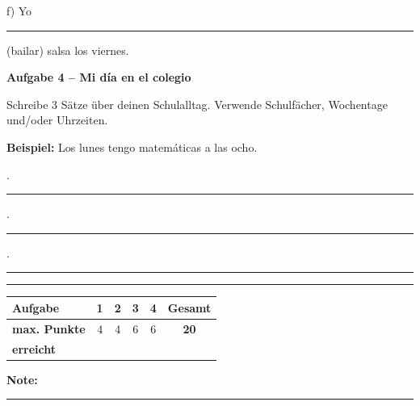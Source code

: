 \documentclass[11pt, a4paper]{article}
\newcommand{\fachfarbe}{spanisch}
\newcommand{\punktebox}[1]{\hfill\fbox{\small \_/#1}}
\newcommand{\luecke}[1]{\rule{#1}{0.4pt}}
\newenvironment{aufgabe}[1]{%
    \needspace{5\baselineskip}%
    \nopagebreak[4]%
    \vspace{10pt}
    \noindent\textbf{\textcolor{\fachfarbe}{Aufgabe #1}}
    \nopagebreak[4]%
    \vspace{5pt}
    \nopagebreak[4]%
    \begin{list}{}{\leftmargin=0pt}
    \item[]
}{%
    \end{list}
}
\begin{document}
\noindent
f) Yo \luecke{2.5cm} (bailar) salsa los viernes.

\vspace{15pt}


\begin{aufgabe}{4 -- Mi día en el colegio}
Schreibe 3 Sätze über deinen Schulalltag. Verwende Schulfächer, Wochentage und/oder Uhrzeiten. \punktebox{6}
\end{aufgabe}

\noindent
\textbf{Beispiel:} Los lunes tengo matemáticas a las ocho.

\vspace{0.8em}

. \luecke{12cm}

\vspace{1em}

. \luecke{12cm}

\vspace{1em}

. \luecke{12cm}


\vspace{25pt}
\hrule
\vspace{10pt}

\noindent
\begin{tabularx}{\textwidth}{|X|c|c|c|c||c|}
\hline
\textbf{Aufgabe} & 1 & 2 & 3 & 4 & \textbf{Gesamt} \\
\hline
\textbf{max. Punkte} & 4 & 4 & 6 & 6 & \textbf{20} \\
\hline
\textbf{erreicht} & & & & & \\[0.8em]
\hline
\end{tabularx}

\vspace{10pt}

\begin{flushright}
\textbf{Note:} \luecke{2cm}
\end{flushright}
\end{document}
